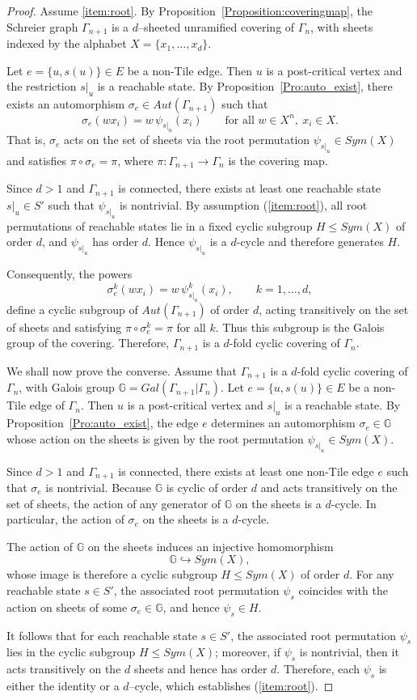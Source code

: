 \documentclass{article}
\newcommand{\G}{\Gamma}
\newcommand{\Gal}{\mathbb{G}}
\begin{document}
\begin{proof} Assume \ref{item:root}. By Proposition~\ref{Proposition:coveringmap}, the Schreier graph $\G_{n+1}$ is a $d$--sheeted unramified covering of $\G_n$, with sheets indexed by the alphabet $X=\{x_1,\dots,x_d\}$.

Let $e=\{u,s(u)\}\in E$ be a non-Tile edge. Then $u$ is a post-critical vertex and the restriction $s|_u$ is a reachable state.
By Proposition~\ref{Pro:auto_exist}, there exists an automorphism $\sigma_e\in Aut(\G_{n+1})$ such that $$\sigma_e(w x_i)= w\,\psi_{s|_u}(x_i)\qquad\text{for all } w\in X^n,\ x_i\in X.$$
That is, $\sigma_e$ acts on the set of sheets via the root permutation $\psi_{s|_u}\in Sym(X)$ and satisfies $\pi\circ\sigma_e=\pi$, where
$\pi:\G_{n+1}\to\G_n$ is the covering map.

Since $d>1$ and $\G_{n+1}$ is connected, there exists at least one reachable state $s|_u\in S'$ such that $\psi_{s|_u}$ is nontrivial. By assumption (\ref{item:root}), all root permutations of reachable states lie in a fixed cyclic subgroup $H\le Sym(X)$ of order $d$, and $\psi_{s|_u}$ has order $d$. Hence $\psi_{s|_u}$ is a $d$-cycle and therefore generates $H$.

Consequently, the powers
$$\sigma_e^k(w x_i)= w\,\psi_{s|_u}^k(x_i),\qquad k=1,\dots,d,$$ define a cyclic subgroup of $Aut(\G_{n+1})$ of order $d$, acting
transitively on the set of sheets and satisfying $\pi\circ\sigma_e^k=\pi$ for all $k$. Thus this subgroup is the Galois group of the covering. Therefore, $\G_{n+1}$ is a $d$-fold cyclic covering of $\G_n$.

We shall now prove the converse. Assume that $\G_{n+1}$ is a $d$-fold cyclic covering of $\G_n$, with Galois group $\Gal=Gal(\G_{n+1}|\G_n)$. Let $e=\{u,s(u)\}\in E$ be a non-Tile edge of $\G_n$. Then $u$ is a post-critical vertex and $s|_u$ is a reachable state. By Proposition~\ref{Pro:auto_exist}, the edge $e$ determines an automorphism $\sigma_e\in\Gal$ whose action on the sheets is given by the root permutation $\psi_{s|_u}\in Sym(X)$. 

Since $d>1$ and $\G_{n+1}$ is connected, there exists at least one non-Tile edge $e$ such that $\sigma_e$ is nontrivial. Because $\Gal$ is cyclic of order $d$ and acts transitively on the set of sheets, the action of any generator of $\Gal$ on the sheets is a $d$-cycle. In particular, the action of $\sigma_e$ on the sheets is a $d$-cycle.

The action of $\Gal$ on the sheets induces an injective homomorphism $$\Gal \hookrightarrow Sym(X),$$  whose image is therefore a cyclic subgroup $H\le Sym(X)$ of order $d$. For any reachable state $s\in S'$, the associated root permutation $\psi_s$ coincides with the action on sheets of some $\sigma_e\in\Gal$, and hence $\psi_s\in H$.

It follows that for each reachable state $s\in S'$, the associated root permutation $\psi_s$ lies in the cyclic subgroup $H\le Sym(X)$; moreover, if $\psi_s$ is nontrivial, then it acts transitively on the $d$ sheets and hence has order $d$. Therefore, each $\psi_s$ is either the identity or a $d$--cycle, which establishes (\ref{item:root}).

\end{proof}
\end{document}
